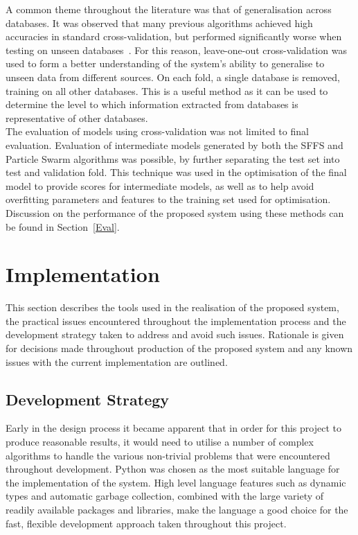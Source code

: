 \documentclass[titlepage, 12pt]{scrartcl} \usepackage{enumitem}
\begin{document}
A common theme throughout the literature was that of generalisation across
databases. It was observed that many previous algorithms achieved high
accuracies in standard cross-validation, but performed significantly worse when
testing on unseen databases~\parencite{Homsi2017, Bobillo2016}. For this
reason, leave-one-out cross-validation was used to form a better understanding
of the system's ability to generalise to unseen data from different sources. On
each fold, a single database is removed, training on all other databases. This
is a useful method as it can be used to determine the level to which
information extracted from databases is representative of other databases.\\

The evaluation of models using cross-validation was not limited to final
evaluation. Evaluation of intermediate models generated by both the SFFS and Particle Swarm
algorithms was possible, by further separating the test set into test and
validation fold. This technique was used in the optimisation of the
final model to provide scores for intermediate models, as well as to help avoid
overfitting parameters and features to the training set used for
optimisation.\\

Discussion on the performance of the proposed system using these methods can be
found in Section~\ref{Eval}.

\section{Implementation}
This section describes the tools used in the realisation of the
proposed system, the practical issues encountered throughout the
implementation process and the development strategy taken to address and avoid
such issues. Rationale is given for decisions made throughout
production of the proposed system and any known issues with the current implementation are
outlined.

\subsection{Development Strategy}
Early in the design process it became apparent that in order for this project
to produce reasonable results, it would need to utilise a number of complex
algorithms to handle the various non-trivial problems that were encountered
throughout development. Python was chosen as the most suitable language for the
implementation of the system. High level language features such as dynamic
types and automatic garbage collection, combined with the large variety of
readily available packages and libraries, make the language a good choice for
the fast, flexible development approach taken throughout this project.\\
\end{document}
